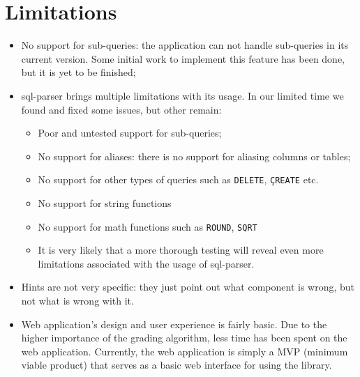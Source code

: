 \section{Limitations}
\begin{itemize}
    \item No support for sub-queries: the application can not handle sub-queries in its current version. Some initial work to implement this feature has been done, but it is yet to be finished;
    \item sql-parser brings multiple limitations with its usage. In our limited time we found and fixed some issues, but other remain:
    \begin{itemize}
        \item Poor and untested support for sub-queries;
        \item No support for aliases: there is no support for aliasing columns or tables;
        \item No support for other types of queries such as \texttt{DELETE}, \texttt{ÇREATE} etc.
        \item No support for string functions
        \item No support for math functions such as \texttt{ROUND}, \texttt{SQRT}
        \item It is very likely that a more thorough testing will reveal even more limitations associated with the usage of sql-parser.
    \end{itemize}
    \item Hints are not very specific: they just point out what component is wrong, but not what is wrong with it.
    \item Web application's design and user experience is fairly basic. Due to the higher importance of the grading algorithm, less time has been spent on the web application. Currently, the web application is simply a MVP (minimum viable product) that serves as a basic web interface for using the library.
\end{itemize}

